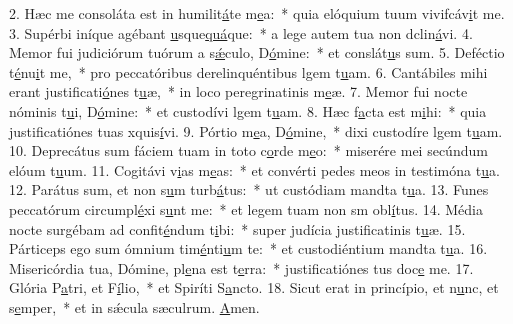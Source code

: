 2. Hæc me consoláta est in humilit\uline{á}te m\uline{e}a:~* quia elóquium tuum vivifcáv\uline{i}t me.
3. Supérbi iníque agébant \uline{u}sque\uline{quá}que:~* a lege autem tua non dclin\uline{á}vi.
4. Memor fui judiciórum tuórum a s\uline{ǽ}culo, D\uline{ó}mine:~* et conslát\uline{u}s sum.
5. Deféctio t\uline{é}nu\uline{i}t me,~* pro peccatóribus derelinquéntibus lgem t\uline{u}am.
6. Cantábiles mihi erant justificati\uline{ó}nes t\uline{u}æ,~* in loco peregrinatinis m\uline{e}æ.
7. Memor fui nocte nóminis t\uline{u}i, D\uline{ó}mine:~* et custodívi lgem t\uline{u}am.
8. Hæc f\uline{a}cta est m\uline{i}hi:~* quia justificatiónes tuas xquis\uline{í}vi.
9. Pórtio m\uline{e}a, D\uline{ó}mine,~* dixi custodíre lgem t\uline{u}am.
10. Deprecátus sum fáciem tuam in toto c\uline{o}rde m\uline{e}o:~* miserére mei secúndum elóum t\uline{u}um.
11. Cogitávi v\uline{i}as m\uline{e}as:~* et convérti pedes meos in testimóna t\uline{u}a.
12. Parátus sum, et non s\uline{u}m turb\uline{á}tus:~* ut custódiam mandta t\uline{u}a.
13. Funes peccatórum circumpl\uline{é}xi s\uline{u}nt me:~* et legem tuam non sm obl\uline{í}tus.
14. Média nocte surgébam ad confit\uline{é}ndum t\uline{i}bi:~* super judícia justificatinis t\uline{u}æ.
15. Párticeps ego sum ómnium tim\uline{é}nti\uline{u}m te:~* et custodiéntium mandta t\uline{u}a.
16. Misericórdia tua, Dómine, pl\uline{e}na est t\uline{e}rra:~* justificatiónes tus doc\uline{e} me.
17. Glória P\uline{a}tri, et F\uline{í}lio,~* et Spiríti S\uline{a}ncto.
18. Sicut erat in princípio, et n\uline{u}nc, et s\uline{e}mper,~* et in sǽcula sæculrum. \uline{A}men.
